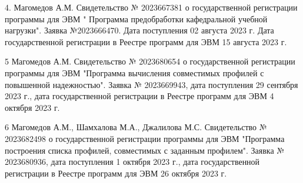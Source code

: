 4. Магомедов А.М. Свидетельство № 2023667381 о государственной регистрации программы для ЭВМ " Программа предобработки кафедральной учебной нагрузки". Заявка №2023666470. Дата поступления 02 августа 2023 г. Дата государственной регистрации в Реестре программ для ЭВМ 15 августа 2023 г.

5 Магомедов А.М. Свидетельство № 2023680654 о государственной регистрации программы для ЭВМ "Программа вычисления совместимых профилей с повышенной надежностью". Заявка № 2023669943, дата поступления 29 сентября 2023 г., дата государственной регистрации в Реестре программ для ЭВМ 4 октября 2023 г. 

6 Магомедов А.М., Шамхалова М.А., Джалилова М.С. Свидетельство № 2023682498 о государственной регистрации программы для ЭВМ "Программа построения списка профилей, совместимых с заданным профилем". Заявка № 2023680936, дата поступления 1 октября 2023 г., дата государственной регистрации в Реестре программ для ЭВМ 26 октября 2023 г.
